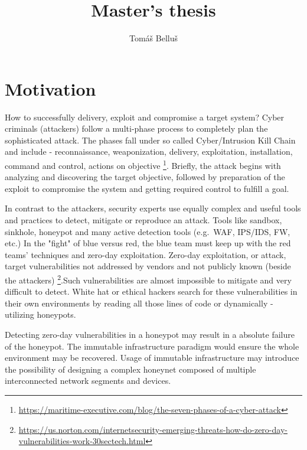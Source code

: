 \documentclass[12pt,a4paper,twoside]{report}
\title{Master's thesis}
\author{Tomáš Belluš}
\begin{document}
	


\thispagestyle{empty}

% 

\newpage{}\thispagestyle{empty}

\newpage
\thispagestyle{empty}
\mbox{}
\newpage

\begingroup
\color{black}
\tableofcontents
\endgroup


\chapter{Motivation}\label{motivation}

How to successfully delivery, exploit and compromise a target system?
Cyber criminals (attackers) follow a multi-phase process to completely
plan the sophisticated attack. The phases fall under so called
Cyber/Intrusion Kill Chain and include - reconnaissance, weaponization,
delivery, exploitation, installation, command and control, actions on objective
\footnote{\url{https://maritime-executive.com/blog/the-seven-phases-of-a-cyber-attack}}.
Briefly, the attack begins with analyzing and discovering the target
objective, followed by preparation of the exploit to compromise the
system and getting required control to fulfill a goal.

In contrast to the attackers, security experts use equally complex and
useful tools and practices to detect, mitigate or reproduce an attack.
Tools like sandbox, sinkhole, honeypot and many active detection tools
(e.g.~WAF, IPS/IDS, FW, etc.) In the "fight" of blue versus red, the
blue team must keep up with the red teams' techniques and zero-day
exploitation. Zero-day exploitation, or attack, target vulnerabilities
not addressed by vendors and not publicly known (beside the attackers)
\footnote{\url{https://us.norton.com/internetsecurity-emerging-threats-how-do-zero-day-vulnerabilities-work-30sectech.html}}.Such
vulnerabilities are almost impossible to mitigate and very difficult to
detect. White hat or ethical hackers search for these vulnerabilities in
their own environments by reading all those lines of code or dynamically
- utilizing honeypots.

Detecting zero-day vulnerabilities in a honeypot may result in a
absolute failure of the honeypot. The immutable infrastructure paradigm
would ensure the whole environment may be recovered. Usage of immutable
infrastructure may introduce the possibility of designing a complex
honeynet composed of multiple interconnected network segments and
devices.
\end{document}

